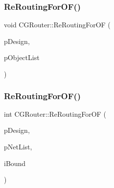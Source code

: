 \mbox{\label{classCGRouter_a1fd03b63f72447aa7085e3320ba6c7ff}} 
\subsubsection{\texorpdfstring{ReRoutingForOF()}{ReRoutingForOF()}\hspace{0.1cm}{\footnotesize\ttfamily [1/3]}}
{\footnotesize\ttfamily void C\+G\+Router\+::\+Re\+Routing\+For\+OF (\begin{DoxyParamCaption}\item[{\mbox{\hyperlink{classCDesign}{C\+Design}} $\ast$}]{p\+Design,  }\item[{hash\+\_\+map$<$ \mbox{\hyperlink{BoxRouter_8h_a280feb883e9d4a7edcc69c8bcb9f38f2}{A\+D\+D\+R\+E\+SS}}, int $>$ $\ast$}]{p\+Object\+List }\end{DoxyParamCaption})\hspace{0.3cm}{\ttfamily [static]}}

\mbox{\label{classCGRouter_a57a58eb17ab26199bc5ec9d202ecdb80}} 
\subsubsection{\texorpdfstring{ReRoutingForOF()}{ReRoutingForOF()}\hspace{0.1cm}{\footnotesize\ttfamily [2/3]}}
{\footnotesize\ttfamily int C\+G\+Router\+::\+Re\+Routing\+For\+OF (\begin{DoxyParamCaption}\item[{\mbox{\hyperlink{classCDesign}{C\+Design}} $\ast$}]{p\+Design,  }\item[{vector$<$ \mbox{\hyperlink{classCNet}{C\+Net}} $\ast$ $>$ $\ast$}]{p\+Net\+List,  }\item[{int}]{i\+Bound }\end{DoxyParamCaption})\hspace{0.3cm}{\ttfamily [static]}}

\mbox{\label{classCGRouter_a6f3bca0f272874e1ceb57fff94ddf921}} 
